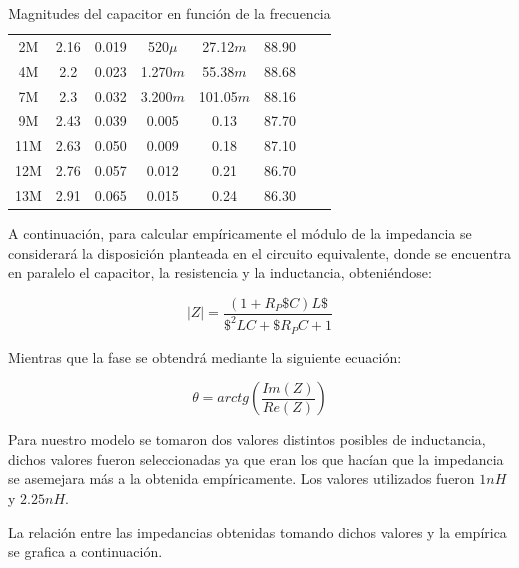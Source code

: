 \begin{center}
\begin{table}[H]
{\begin{tabular}{ c c c c c c c c }
			2M   & 2.16 & 0.019 & 520$\mu$    & 27.12$m$ & 88.90 \\
			4M   & 2.2  & 0.023 & 1.270$m$   & 55.38$m$  & 88.68 \\
			7M   & 2.3  & 0.032 & 3.200$m$    & 101.05$m$ & 88.16 \\
			9M   & 2.43 & 0.039 & 0.005   & 0.13  & 87.70 \\
			11M  & 2.63 & 0.050 & 0.009   & 0.18   & 87.10 \\
			12M  & 2.76 & 0.057 & 0.012   & 0.21   & 86.70 \\
			13M  & 2.91 & 0.065 & 0.015   & 0.24   & 86.30 \\
            \hline 
        \end{tabular}
        }
        \caption{Magnitudes del capacitor en función de la frecuencia}
        \label{table:Rta_en_frecuencia_capacitor}
    \end{table}
\end{center}
A continuación, para calcular empíricamente el módulo de la impedancia se considerará la disposición planteada en el circuito equivalente, donde se encuentra en paralelo el capacitor, la resistencia y la inductancia, obteniéndose: 

\begin{equation}
|Z|= \frac{(1+R_P\$C)L\$}{\$^2LC+\$R_PC+1}
\end{equation}

Mientras que la fase se obtendrá mediante la siguiente ecuación:

\begin{equation}
\theta= arctg\left(\frac{Im(Z)}{Re(Z)}\right)
\end{equation}

Para nuestro modelo se tomaron dos valores distintos posibles de inductancia, dichos valores fueron seleccionadas ya que eran los que hacían que la impedancia se asemejara más a la obtenida empíricamente. Los valores utilizados fueron $1nH$ y $2.25nH$.

La relación entre las impedancias obtenidas tomando dichos valores y la empírica se grafica a continuación.

